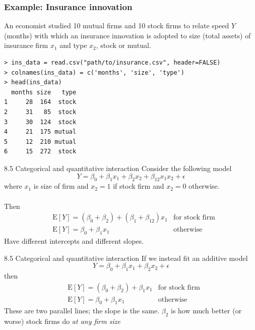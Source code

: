 \documentclass{beamer}
\newcommand{\E}{\mathrm{E}}
\begin{document}
\begin{frame}[fragile]
\frametitle{Example: Insurance innovation}
An economist studied 10 mutual firms and 10 stock firms to relate speed $Y$ (months) with which an insurance innovation is adopted to size (total assets) of insurance firm $x_1$ and type $x_2$, stock or mutual.
\begin{footnotesize}
\pause \begin{verbatim}
> ins_data = read.csv("path/to/insurance.csv", header=FALSE)
> colnames(ins_data) = c('months', 'size', 'type')
> head(ins_data)
  months size   type
1     28  164  stock
2     31   85  stock
3     30  124  stock
4     21  175 mutual
5     12  210 mutual
6     15  272  stock
\end{verbatim}
\end{footnotesize}
\end{frame}


\begin{frame}{8.5 Categorical and quantitative interaction}
Consider the following model
$$
Y=\beta_0+\beta_1 x_1 +\beta_2 x_2 + \beta_{12}x_1 x_2 + \epsilon
$$
where $x_1$ is size of firm and $x_2=1$ if stock firm and $x_{2}=0$ otherwise.\\~\\

\pause Then
\begin{align*}
&\E[Y]=(\beta_0+\beta_2)+(\beta_1+\beta_{12})x_1 &\text{for stock firm}\\
&\E[Y]=\beta_0+\beta_1 x_1 &\text{otherwise}
\end{align*}
\pause Have different intercepts and different slopes. 
\end{frame}

\begin{frame}{8.5 Categorical and quantitative interaction}
If we instead fit an additive model
$$
Y=\beta_0+\beta_1 x_1 + \beta_2 x_2 + \epsilon
$$
then
\begin{align*}
&\E[Y]=(\beta_0+\beta_2)+\beta_1 x_1 &\text{for stock firm}\\
&\E[Y]=\beta_0+\beta_1 x_1 &\text{otherwise}
\end{align*}
These are two \alert{parallel} lines; the slope is the same. $\beta_2$ is how much better (or worse) stock firms do \textit{at any firm size}
\end{frame}
\end{document}
